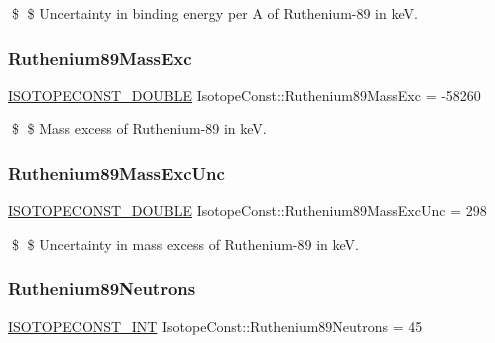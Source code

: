 \$ \$ Uncertainty in binding energy per A of Ruthenium-\/89 in keV. \mbox{\label{group___isotope_const-_ruthenium-_ru89_ga822f599610e9cb2a6e105e4e0cd92e9e}} 
\subsubsection{\texorpdfstring{Ruthenium89\+Mass\+Exc}{Ruthenium89MassExc}}
{\footnotesize\ttfamily \mbox{\hyperlink{group___isotope_const-_macros_ga8f45a7272ce02c0b4c65c44636ed719a}{I\+S\+O\+T\+O\+P\+E\+C\+O\+N\+S\+T\+\_\+\+D\+O\+U\+B\+LE}} Isotope\+Const\+::\+Ruthenium89\+Mass\+Exc = -\/58260}

\$ \$ Mass excess of Ruthenium-\/89 in keV. \mbox{\label{group___isotope_const-_ruthenium-_ru89_ga6fbb70c9004f531d92b45e7b4c3d4de8}} 
\subsubsection{\texorpdfstring{Ruthenium89\+Mass\+Exc\+Unc}{Ruthenium89MassExcUnc}}
{\footnotesize\ttfamily \mbox{\hyperlink{group___isotope_const-_macros_ga8f45a7272ce02c0b4c65c44636ed719a}{I\+S\+O\+T\+O\+P\+E\+C\+O\+N\+S\+T\+\_\+\+D\+O\+U\+B\+LE}} Isotope\+Const\+::\+Ruthenium89\+Mass\+Exc\+Unc = 298}

\$ \$ Uncertainty in mass excess of Ruthenium-\/89 in keV. \mbox{\label{group___isotope_const-_ruthenium-_ru89_ga52a7685e8abb6c1b7d7dfacb1fcd1abc}} 
\subsubsection{\texorpdfstring{Ruthenium89\+Neutrons}{Ruthenium89Neutrons}}
{\footnotesize\ttfamily \mbox{\hyperlink{group___isotope_const-_macros_ga5f18360b3e99483a35c32d789e62621c}{I\+S\+O\+T\+O\+P\+E\+C\+O\+N\+S\+T\+\_\+\+I\+NT}} Isotope\+Const\+::\+Ruthenium89\+Neutrons = 45}

